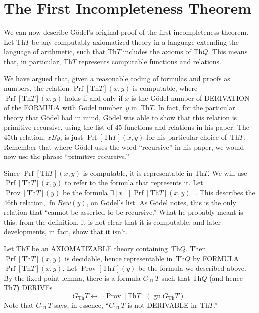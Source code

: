 \documentclass[10pt,a4paper]{article}
\newcommand*{\olup}[1]{\MakeUppercase{#1}}
\theoremstyle{plain}
\theoremstyle{definition}
\theoremstyle{remark}
\newcommand*{\olfileid}[3]{}
\newcommand*{\olsection}[1]{\section*{#1}}
\newcommand*{\ollabel}[1]{\label{#1}}
\providecommand{\lexists}{\mathord{\exists}}
\providecommand{\Th}{\ensuremath{\mathrm{Th}}}
\providecommand{\Prf}{\operatorname{Prf}}
\providecommand{\gn}{\operatorname{gn}}
\providecommand{\liff}{\mathbin{\leftrightarrow}}
\providecommand{\OProv}{\operatorname{Prov}}
\providecommand{\OPrf}{\operatorname{Prf}}
\providecommand{\fn}{\operatorname{fn}}
\begin{document}



\olfileid{inc}{inp}{1in}

\olsection{The First Incompleteness Theorem}

We can now describe G\"odel's original proof of the first
incompleteness theorem. Let $\Th{T}$ be any computably axiomatized theory
in a language extending the language of arithmetic, such that $\Th{T}$
includes the axioms of $\Th{Q}$. This means that, in particular, $\Th{T}$
represents computable functions and relations.

We have argued that, given a reasonable coding of formulas and proofs
as numbers, the relation $\Prf[\Th{T}](x,y)$ is computable, where
$\Prf[\Th{T}](x,y)$ holds if and only if $x$ is the G\"odel number of
\olup{derivation} of the \olup{formula} with G\"odel number~$y$
in~$\Th{T}$. In fact, for the particular theory that G\"odel had in
mind, G\"odel was able to show that this relation is primitive
recursive, using the list of 45 functions and relations in his
paper. The 45th relation, $x B y$, is just $\Prf[\Th{T}](x,y)$ for his
particular choice of~$\Th{T}$. Remember that where G\"odel uses the
word ``recursive'' in his paper, we would now use the phrase
``primitive recursive.''

Since $\Prf[\Th{T}](x,y)$ is computable, it is representable in $\Th{T}$. We
will use $\OPrf[\Th{T}](x,y)$ to refer to the formula that represents
it. Let $\OProv[\Th{T}](y)$ be the formula
$\lexists[x][\OPrf[\Th{T}](x,y)]$. This describes the 46th relation,
$\fn{Bew}(y)$, on G\"odel's list. As G\"odel notes, this is the only
relation that ``cannot be asserted to be recursive.''  What he
probably meant is this: from the definition, it is not clear that it
is computable; and later developments, in fact, show that it isn't.

Let $\Th{T}$ be an \olup{axiomatizable} theory containing~$\Th{Q}$. Then
$\Prf[\Th{T}](x, y)$ is decidable, hence representable in~$\Th{Q}$ by
\olup{formula}~$\OPrf[\Th{T}](x, y)$. Let $\OProv[\Th{T}](y)$ be the formula we
described above. By the fixed-point lemma, there is a formula
$G_\Th{T}$ such that $\Th{Q}$ (and hence $\Th{T}$) \olup{derive}s
\begin{equation}
\ollabel{eqn:qpf}
G_\Th{T} \liff \lnot \OProv[\Th{T}](\gn{G_\Th{T}}).
\end{equation}
Note that $G_\Th{T}$ says, in essence, ``$G_\Th{T}$ is not
\olup{derivable} in~$\Th{T}$.''
\end{document}
